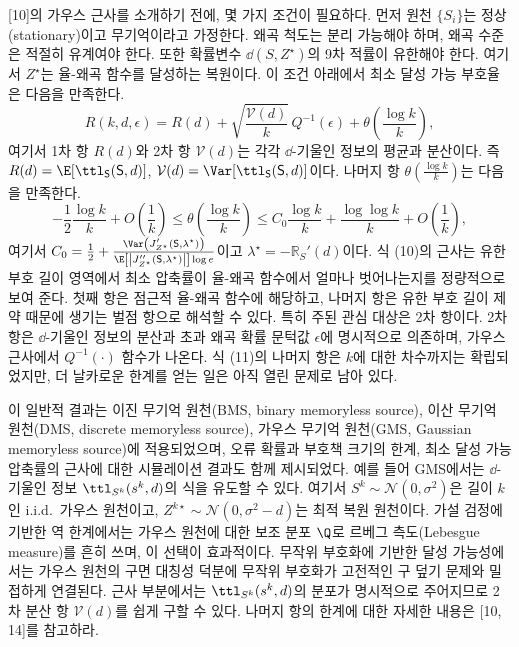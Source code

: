 [10]의 가우스 근사를 소개하기 전에, 몇 가지 조건이 필요하다.
먼저 원천 $\{S_i\}$는 정상(stationary)이고 무기억이라고 가정한다. 왜곡 척도는 분리 가능해야 하며, 왜곡 수준은 적절히 유계여야 한다.
또한 확률변수 $\dd(S,Z^\star)$의 9차 적률이 유한해야 한다. 여기서 $Z^\star$는 율-왜곡 함수를 달성하는 복원이다.
이 조건 아래에서 최소 달성 가능 부호율은 다음을 만족한다.
\begin{equation}
  R(k,d,\epsilon) = R(d) + \sqrt{\frac{\mathcal{V}(d)}{k}}\,Q^{-1}(\epsilon) + \theta\left(\frac{\log k}{k}\right),
  \tag{10}
\end{equation}
여기서 1차 항 $R(d)$와 2차 항 $\mathcal{V}(d)$는 각각 $\dd$-기울인 정보의 평균과 분산이다. 즉 $R(d)=\E[\ttl_{\mathsf{S}}(\mathsf{S},d)]$, $\mathcal{V}(d)=\Var[\ttl_{\mathsf{S}}(\mathsf{S},d)]$이다.
나머지 항 $\theta\left(\frac{\log k}{k}\right)$는 다음을 만족한다.
\begin{equation}
  -\frac{1}{2}\frac{\log k}{k} + O\left(\frac{1}{k}\right)
  \le \theta\left(\frac{\log k}{k}\right)
  \le C_0\frac{\log k}{k} + \frac{\log\log k}{k} + O\left(\frac{1}{k}\right),
  \tag{11}
\end{equation}
여기서 $C_0 = \frac{1}{2} + \frac{\Var\left(J'_{Z^\star}(\mathsf{S},\lambda^\star)\right)}{\E\left[\left|J''_{Z^\star}(\mathsf{S},\lambda^\star)\right|\right]\log e}$이고 $\lambda^\star=-\mathbb{R}_S'(d)$이다.
식 (10)의 근사는 유한 부호 길이 영역에서 최소 압축률이 율-왜곡 함수에서 얼마나 벗어나는지를 정량적으로 보여 준다.
첫째 항은 점근적 율-왜곡 함수에 해당하고, 나머지 항은 유한 부호 길이 제약 때문에 생기는 벌점 항으로 해석할 수 있다.
특히 주된 관심 대상은 2차 항이다.
2차 항은 $\dd$-기울인 정보의 분산과 초과 왜곡 확률 문턱값 $\epsilon$에 명시적으로 의존하며, 가우스 근사에서 $Q^{-1}(\cdot)$ 함수가 나온다.
식 (11)의 나머지 항은 $k$에 대한 차수까지는 확립되었지만, 더 날카로운 한계를 얻는 일은 아직 열린 문제로 남아 있다.

이 일반적 결과는 이진 무기억 원천(BMS, binary memoryless source), 이산 무기억 원천(DMS, discrete memoryless source), 가우스 무기억 원천(GMS, Gaussian memoryless source)에 적용되었으며, 오류 확률과 부호책 크기의 한계, 최소 달성 가능 압축률의 근사에 대한 시뮬레이션 결과도 함께 제시되었다.
예를 들어 GMS에서는 $\dd$-기울인 정보 $\ttl_{S^k}(s^k,d)$의 식을 유도할 수 있다.
여기서 $S^k\sim\mathcal{N}(0,\sigma^2)$은 길이 $k$인 i.i.d.\ 가우스 원천이고, $Z^{k\star}\sim\mathcal{N}(0,\sigma^2-d)$는 최적 복원 원천이다.
가설 검정에 기반한 역 한계에서는 가우스 원천에 대한 보조 분포 $\Q$로 르베그 측도(Lebesgue measure)를 흔히 쓰며, 이 선택이 효과적이다.
무작위 부호화에 기반한 달성 가능성에서는 가우스 원천의 구면 대칭성 덕분에 무작위 부호화가 고전적인 구 덮기 문제와 밀접하게 연결된다.
근사 부분에서는 $\ttl_{S^k}(s^k,d)$의 분포가 명시적으로 주어지므로 2차 분산 항 $\mathcal{V}(d)$를 쉽게 구할 수 있다.
나머지 항의 한계에 대한 자세한 내용은 [10, 14]를 참고하라.

